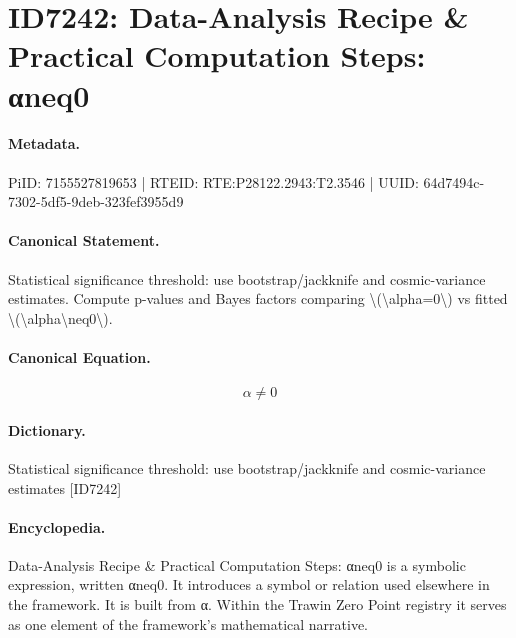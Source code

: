 \section*{ID7242: Data-Analysis Recipe \& Practical Computation Steps: αneq0}
\paragraph{Metadata.}
PiID: 7155527819653 | RTEID: RTE:P28122.2943:T2.3546 | UUID: 64d7494c-7302-5df5-9deb-323fef3955d9

\paragraph{Canonical Statement.}
Statistical significance threshold: use bootstrap/jackknife and cosmic-variance estimates. Compute p-values and Bayes factors comparing \textbackslash{}(\textbackslash{}alpha=0\textbackslash{}) vs fitted \textbackslash{}(\textbackslash{}alpha\textbackslash{}neq0\textbackslash{}).

\paragraph{Canonical Equation.}
\[
\alpha\neq0
\]

\paragraph{Dictionary.}
Statistical significance threshold: use bootstrap/jackknife and cosmic-variance estimates [ID7242]

\paragraph{Encyclopedia.}
Data-Analysis Recipe \& Practical Computation Steps: αneq0 is a symbolic expression, written αneq0. It introduces a symbol or relation used elsewhere in the framework. It is built from α. Within the Trawin Zero Point registry it serves as one element of the framework's mathematical narrative.
